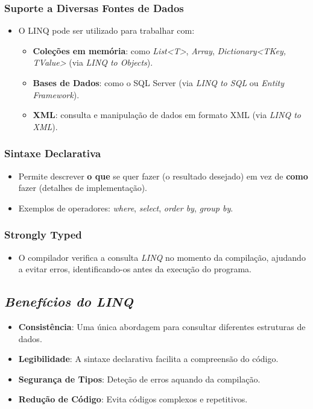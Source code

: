 \documentclass[11pt]{scrartcl} %
\begin{document}
\subsubsection{Suporte a Diversas Fontes de Dados}
\begin{itemize}
	\item O LINQ pode ser utilizado para trabalhar com:
		\begin{itemize}
			\item \textbf{Coleções em memória}: como \textit{List<T>}, \textit{Array}, \textit{Dictionary<TKey, TValue>} (via \textit{LINQ to Objects}).
			\item \textbf{Bases de Dados}: como o SQL Server (via \textit{LINQ to SQL} ou \textit{Entity Framework}).
			\item \textbf{XML}: consulta e manipulação de dados em formato XML (via \textit{LINQ to XML}).	
		\end{itemize}
\end{itemize}

\subsubsection{Sintaxe Declarativa}
\begin{itemize}
	\item Permite descrever \textbf{o que} se quer fazer (o resultado desejado) em vez de \textbf{como} fazer (detalhes de implementação).
	\item Exemplos de operadores: \textit{where}, \textit{select}, \textit{order by}, \textit{group by}.
\end{itemize}

\subsubsection{Strongly Typed}
\begin{itemize}
	\item O compilador verifica a consulta \textit{LINQ} no momento da compilação, ajudando a evitar erros, identificando-os antes da execução do programa.
\end{itemize}

\subsection{\textit{Benefícios do \textit{LINQ}}}
\begin{itemize}
	\item \textbf{Consistência}: Uma única abordagem para consultar diferentes estruturas de dados.
	\item \textbf{Legibilidade}: A sintaxe declarativa facilita a compreensão do código.
	\item \textbf{Segurança de Tipos}: Deteção de erros aquando da compilação.
	\item \textbf{Redução de Código}: Evita códigos complexos e repetitivos.	
\end{itemize}
\end{document}
